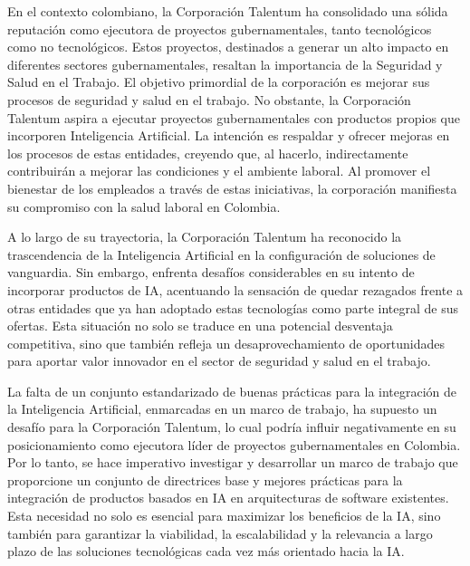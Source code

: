 
En el contexto colombiano, la Corporación Talentum ha consolidado una sólida reputación como ejecutora de proyectos gubernamentales, tanto tecnológicos como no tecnológicos. Estos proyectos, destinados a generar un alto impacto en diferentes sectores gubernamentales, resaltan la importancia de la Seguridad y Salud en el Trabajo. El objetivo primordial de la corporación es mejorar sus procesos de seguridad y salud en el trabajo. No obstante, la Corporación Talentum aspira a ejecutar proyectos gubernamentales con productos propios que incorporen Inteligencia Artificial. La intención es respaldar y ofrecer mejoras en los procesos de estas entidades, creyendo que, al hacerlo, indirectamente contribuirán a mejorar las condiciones y el ambiente laboral. Al promover el bienestar de los empleados a través de estas iniciativas, la corporación manifiesta su compromiso con la salud laboral en Colombia.

A lo largo de su trayectoria, la Corporación Talentum ha reconocido la trascendencia de la Inteligencia Artificial en la configuración de soluciones de vanguardia. Sin embargo, enfrenta desafíos considerables en su intento de incorporar productos de IA, acentuando la sensación de quedar rezagados frente a otras entidades que ya han adoptado estas tecnologías como parte integral de sus ofertas. Esta situación no solo se traduce en una potencial desventaja competitiva, sino que también refleja un desaprovechamiento de oportunidades para aportar valor innovador en el sector de seguridad y salud en el trabajo. 

La falta de un conjunto estandarizado de buenas pr\'acticas para la integración de la Inteligencia Artificial, enmarcadas en un marco de trabajo, ha supuesto un desafío para la Corporación Talentum, lo cual podría influir negativamente en su posicionamiento como ejecutora líder de proyectos gubernamentales en Colombia. Por lo tanto, se hace imperativo investigar y desarrollar un marco de trabajo que proporcione un conjunto de directrices base y mejores prácticas para la integración de productos basados en IA en arquitecturas de software existentes. Esta necesidad no solo es esencial para maximizar los beneficios de la IA, sino también para garantizar la viabilidad, la escalabilidad y la relevancia a largo plazo de las soluciones tecnológicas cada vez más orientado hacia la IA.


